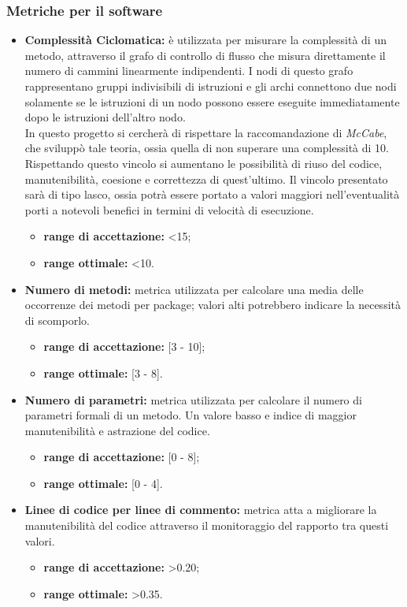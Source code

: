 		\subsubsection{Metriche per il software}
			\begin{itemize}
				\item \textbf{Complessità Ciclomatica:} è utilizzata per misurare la complessità di un metodo, attraverso il grafo di controllo di flusso che misura direttamente il numero di cammini linearmente indipendenti. I nodi di questo grafo rappresentano gruppi indivisibili di istruzioni e gli archi connettono due nodi solamente se le istruzioni di un nodo possono essere eseguite immediatamente dopo le istruzioni dell'altro nodo.\\
				In questo progetto si cercherà di rispettare la raccomandazione di \textit{McCabe}, che sviluppò tale teoria, ossia quella di non superare una complessità di 10. Rispettando questo vincolo si aumentano le possibilità di riuso del codice, manutenibilità, coesione e correttezza di quest'ultimo. Il vincolo presentato sarà di tipo lasco, ossia potrà essere portato a valori maggiori nell'eventualità porti a notevoli benefici in termini di velocità di esecuzione.
				\begin{itemize}
					\item \textbf{range di accettazione:} <15;
					\item \textbf{range ottimale:} <10.
				\end{itemize}				
				\item \textbf{Numero di metodi:} metrica utilizzata per calcolare una media delle occorrenze dei metodi per package; valori alti potrebbero indicare la necessità di scomporlo. 	
				\begin{itemize}
					\item \textbf{range di accettazione:} [3 - 10];
					\item \textbf{range ottimale:} [3 - 8].
				\end{itemize}
				
				\item \textbf{Numero di parametri:} metrica utilizzata per calcolare il numero di parametri formali di un metodo. Un valore basso e indice di maggior manutenibilità e astrazione del codice.
				\begin{itemize}
					\item \textbf{range di accettazione:} [0 - 8];
					\item \textbf{range ottimale:} [0 - 4].
				\end{itemize}
				\item \textbf{Linee di codice per linee di commento:} metrica atta a migliorare la manutenibilità del codice attraverso il monitoraggio del rapporto tra questi valori.
				\begin{itemize}
					\item \textbf{range di accettazione:} >0.20;
					\item \textbf{range ottimale:} >0.35.
				\end{itemize}				
				

\end{itemize}
